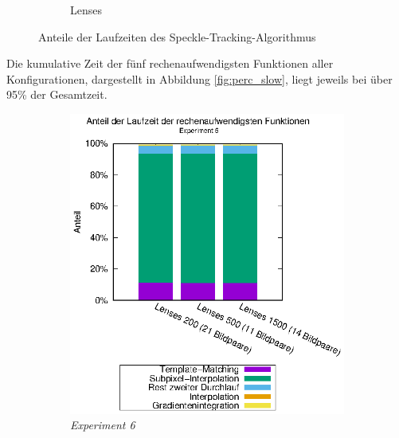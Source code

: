\begin{center}
\begin{figure}[htbp]
\begin{subfigure}[b]{0.5\textwidth}
			\caption{Lenses}
			\label{fig:perc_speckle_lenses}
		\end{subfigure}
		\caption{Anteile der Laufzeiten des Speckle-Tracking-Algorithmus}
		\label{fig:perc_speckle}
	\end{figure}
\end{center}

Die kumulative Zeit der fünf rechenaufwendigsten Funktionen aller Konfigurationen, dargestellt in Abbildung \ref{fig:perc_slow}, liegt jeweils bei über 95\% der Gesamtzeit. 

\begin{center}
	\begin{figure}[htbp]
		\begin{subfigure}[b]{0.5\textwidth}
			\centering
			\includegraphics[width=\textwidth]{pdf/slow_exp6}
			\caption{\textit{Experiment 6}}
			\label{fig:perc_slow_exp6}
		\end{subfigure}
		\begin{subfigure}[b]{0.5\textwidth}
			\centering

\end{subfigure}
\end{figure}
\end{center}
